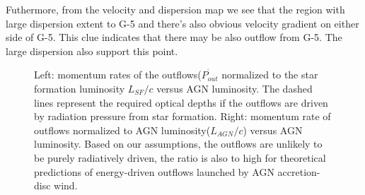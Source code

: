 \documentclass{subfiles}
\begin{document}
	Futhermore, from the velocity and dispersion map we see that the region with large dispersion extent to G-5 and there's also obvious velocity gradient on either side of G-5. This clue indicates that there may be also outflow from G-5. The large dispersion also support this point.  
	\begin{figure}
		\centering
		\label{coupeffic}
		\caption{Left: momentum rates of the outflows($\dot{P_{out}}$ normalized to the star formation luminosity $L_{SF}/c$ versus AGN luminosity. The dashed lines represent the required optical depths if the outflows are driven by radiation pressure from star formation. Right: momentum rate of outflows normalized to AGN luminosity($L_{AGN}/c$) versus AGN luminosity. Based on our assumptions, the outflows are unlikely to be purely radiatively driven, the ratio is also to high for theoretical predictions of energy-driven outflows launched by AGN accretion-disc wind.}
	\end{figure}
\end{document}
